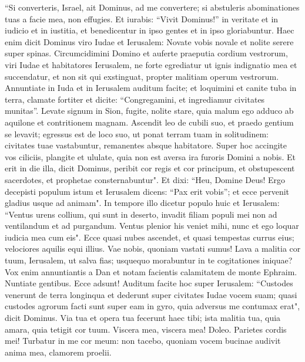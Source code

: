 \begin{biblechapter}  
\verse “Si converteris, Israel, ait Dominus, ad me convertere; si abstuleris abominationes tuas a facie mea, non effugies. 
\verse Et iurabis: “Vivit Dominus!” in veritate et in iudicio et in iustitia, et benedicentur in ipso gentes et in ipso gloriabuntur. 
\verse Haec enim dicit Dominus viro Iudae et Ierusalem: Novate vobis novale et nolite serere super spinas. 
\verse Circumcidimini Domino et auferte praeputia cordium vestrorum, viri Iudae et habitatores Ierusalem, ne forte egrediatur ut ignis indignatio mea et succendatur, et non sit qui exstinguat, propter malitiam operum vestrorum. 
\verse Annuntiate in Iuda et in Ierusalem auditum facite; et loquimini et canite tuba in terra, clamate fortiter et dicite: “Congregamini, et ingrediamur civitates munitas”. 
\verse Levate signum in Sion, fugite, nolite stare, quia malum ego adduco ab aquilone et contritionem magnam. 
\verse Ascendit leo de cubili suo, et praedo gentium se levavit; egressus est de loco suo, ut ponat terram tuam in solitudinem: civitates tuae vastabuntur, remanentes absque habitatore. 
\verse Super hoc accingite vos ciliciis, plangite et ululate, quia non est aversa ira furoris Domini a nobis. 
\verse Et erit in die illa, dicit Dominus, peribit cor regis et cor principum, et obstupescent sacerdotes, et prophetae consternabuntur". 
\verse Et dixi: “Heu, Domine Deus! Ergo decepisti populum istum et Ierusalem dicens: “Pax erit vobis”; et ecce pervenit gladius usque ad animam". 
\verse In tempore illo dicetur populo huic et Ierusalem: “Ventus urens collium, qui sunt in deserto, invadit filiam populi mei non ad ventilandum et ad purgandum. 
\verse Ventus plenior his veniet mihi, nunc et ego loquar iudicia mea cum eis". 
\verse Ecce quasi nubes ascendet, et quasi tempestas currus eius; velociores aquilis equi illius. Vae nobis, quoniam vastati sumus! 
\verse Lava a malitia cor tuum, Ierusalem, ut salva fias; usquequo morabuntur in te cogitationes iniquae? 
\verse Vox enim annuntiantis a Dan et notam facientis calamitatem de monte Ephraim. 
\verse Nuntiate gentibus. Ecce adsunt! Auditum facite hoc super Ierusalem: “Custodes venerunt de terra longinqua et dederunt super civitates Iudae vocem suam; 
\verse quasi custodes agrorum facti sunt super eam in gyro, quia adversus me contumax erat", dicit Dominus. 
\verse Via tua et opera tua fecerunt haec tibi; ista malitia tua, quia amara, quia tetigit cor tuum. 
\verse Viscera mea, viscera mea! Doleo. Parietes cordis mei! Turbatur in me cor meum: non tacebo, quoniam vocem bucinae audivit anima mea, clamorem proelii. 

\end{biblechapter}
